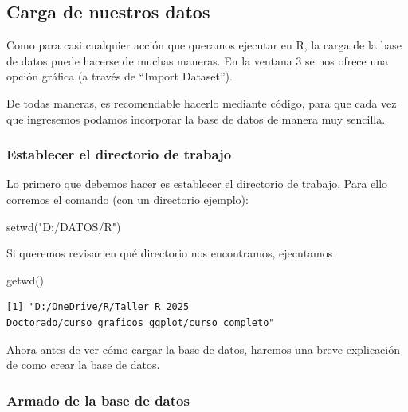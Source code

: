 \documentclass[
  letterpaper,
  DIV=11,
  numbers=noendperiod]{scrartcl}
\newenvironment{Shaded}{\begin{snugshade}}{\end{snugshade}}
\newcommand{\FunctionTok}[1]{\textcolor[rgb]{0.28,0.35,0.67}{#1}}
\newcommand{\NormalTok}[1]{\textcolor[rgb]{0.00,0.23,0.31}{#1}}
\newcommand{\StringTok}[1]{\textcolor[rgb]{0.13,0.47,0.30}{#1}}
\begin{document}
\hypertarget{carga-de-nuestros-datos}{%
\subsection{Carga de nuestros datos}\label{carga-de-nuestros-datos}}

Como para casi cualquier acción que queramos ejecutar en R, la carga de
la base de datos puede hacerse de muchas maneras. En la ventana 3 se nos
ofrece una opción gráfica (a través de ``Import Dataset'').

De todas maneras, es recomendable hacerlo mediante código, para que cada
vez que ingresemos podamos incorporar la base de datos de manera muy
sencilla.

\hypertarget{establecer-el-directorio-de-trabajo}{%
\subsubsection{Establecer el directorio de
trabajo}\label{establecer-el-directorio-de-trabajo}}

Lo primero que debemos hacer es establecer el directorio de trabajo.
Para ello corremos el comando (con un directorio ejemplo):

\begin{Shaded}
\begin{Highlighting}[]
\FunctionTok{setwd}\NormalTok{(}\StringTok{"D:/DATOS/R"}\NormalTok{)}
\end{Highlighting}
\end{Shaded}

Si queremos revisar en qué directorio nos encontramos, ejecutamos

\begin{Shaded}
\begin{Highlighting}[]
\FunctionTok{getwd}\NormalTok{()}
\end{Highlighting}
\end{Shaded}

\begin{verbatim}
[1] "D:/OneDrive/R/Taller R 2025 Doctorado/curso_graficos_ggplot/curso_completo"
\end{verbatim}

Ahora antes de ver cómo cargar la base de datos, haremos una breve
explicación de como crear la base de datos.

\hypertarget{armado-de-la-base-de-datos}{%
\subsubsection{Armado de la base de
datos}\label{armado-de-la-base-de-datos}}
\end{document}
